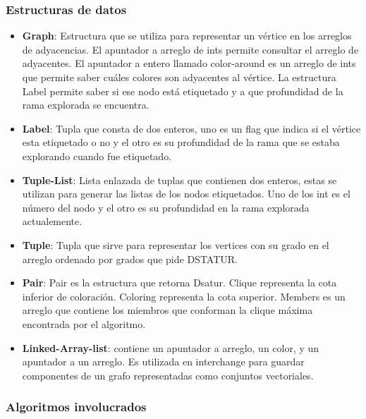 \documentclass[a4paper,10pt]{article}
\begin{document}
\subsubsection{Estructuras de datos}
\begin{itemize}
 \item \textbf{Graph}: Estructura que se utiliza para representar
       un v\'ertice en los arreglos de adyacencias. El apuntador a arreglo de ints
       permite consultar el arreglo de adyacentes. El apuntador a entero llamado
       color-around es un arreglo de ints que permite saber cuáles colores
       son adyacentes al v\'ertice. La estructura Label permite saber
       si ese nodo est\'a etiquetado y a que profundidad de la rama
       explorada se encuentra.
 \item \textbf{Label}: Tupla que consta de dos enteros, uno es un flag
       que indica si el v\'ertice esta etiquetado o no y el otro es su
       profundidad de la rama que se estaba explorando cuando fue
       etiquetado.
 \item \textbf{Tuple-List}: Lista enlazada de tuplas que contienen dos
       enteros, estas se utilizan para generar las listas de los nodos
       etiquetados. Uno de los int es el n\'umero del nodo y el otro es
       su profundidad en la rama explorada actualemente.
 \item \textbf{Tuple}: Tupla que sirve para representar los vertices con su 
       grado en el arreglo ordenado por grados que pide DSTATUR.
 \item \textbf{Pair}: Pair es la estructura que retorna Dsatur.
       Clique representa la cota inferior de coloración.
       Coloring representa la cota superior.
       Members es un arreglo que contiene los miembros
       que conforman la clique máxima encontrada por el algoritmo.
 \item \textbf{Linked-Array-list}: contiene un apuntador a arreglo, un
       color, y un apuntador a un arreglo. Es utilizada en interchange 
       para guardar componentes de un grafo representadas como conjuntos
       vectoriales.
\end{itemize}
 
\subsubsection{Algoritmos involucrados}
\end{document}

